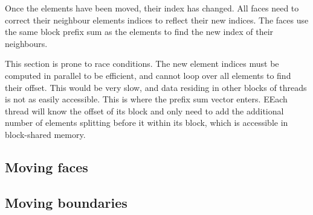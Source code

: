 Once the elements have been moved, their index has changed. All faces need to correct their
neighbour elements indices to reflect their new indices. The faces use the same block prefix sum as
the elements to find the new index of their neighbours.

This section is prone to race conditions. The new element indices must be computed in parallel to be
efficient, and cannot loop over all elements to find their offset. This would be very slow, and data
residing in other blocks of threads is not as easily accessible. This is where the prefix sum vector
enters. EEach thread will know the offset of its block and only need to add the additional number of
elements splitting before it within its block, which is accessible in block-shared memory.

\subsection{Moving faces} \label{section:adaptive_mesh_refinement:implementation:moving_faces}


\subsection{Moving boundaries} \label{section:adaptive_mesh_refinement:implementation:moving_boundaries}

